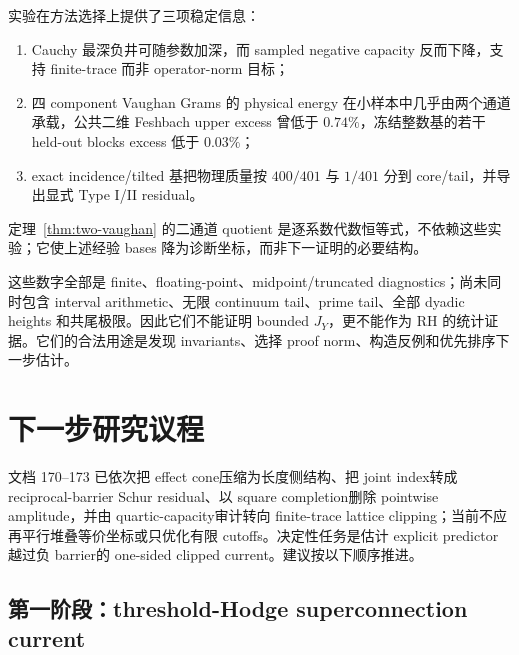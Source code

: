 \documentclass[UTF8,11pt,a4paper]{ctexart}
\theoremstyle{definition}
\theoremstyle{remark}
\newcommand{\1}{\mathbf 1}
\begin{document}
实验在方法选择上提供了三项稳定信息：
\begin{enumerate}
  \item Cauchy 最深负井可随参数加深，而 sampled negative capacity 反而下降，支持 finite-trace 而非 operator-norm 目标；
  \item 四 component Vaughan Grams 的 physical energy 在小样本中几乎由两个通道承载，公共二维 Feshbach upper excess 曾低于 $0.74\%$，冻结整数基的若干 held-out blocks excess 低于 $0.03\%$；
  \item exact incidence/tilted 基把物理质量按 $400/401$ 与 $1/401$ 分到 core/tail，并导出显式 Type I/II residual。
\end{enumerate}

定理~\ref{thm:two-vaughan} 的二通道 quotient 是逐系数代数恒等式，不依赖这些实验；它使上述经验 bases 降为诊断坐标，而非下一证明的必要结构。

这些数字全部是 finite、floating-point、midpoint/truncated diagnostics；尚未同时包含 interval arithmetic、无限 continuum tail、prime tail、全部 dyadic heights 和共尾极限。因此它们不能证明 bounded $J_Y$，更不能作为 RH 的统计证据。它们的合法用途是发现 invariants、选择 proof norm、构造反例和优先排序下一步估计。

\section{下一步研究议程}

文档 170--173 已依次把 effect cone压缩为长度侧结构、把 joint index转成 reciprocal-barrier Schur residual、以 square completion删除 pointwise amplitude，并由 quartic-capacity审计转向 finite-trace lattice clipping；当前不应再平行堆叠等价坐标或只优化有限 cutoffs。决定性任务是估计 explicit predictor越过负 barrier的 one-sided clipped current。建议按以下顺序推进。

\subsection{第一阶段：threshold-Hodge superconnection current}
\end{document}
